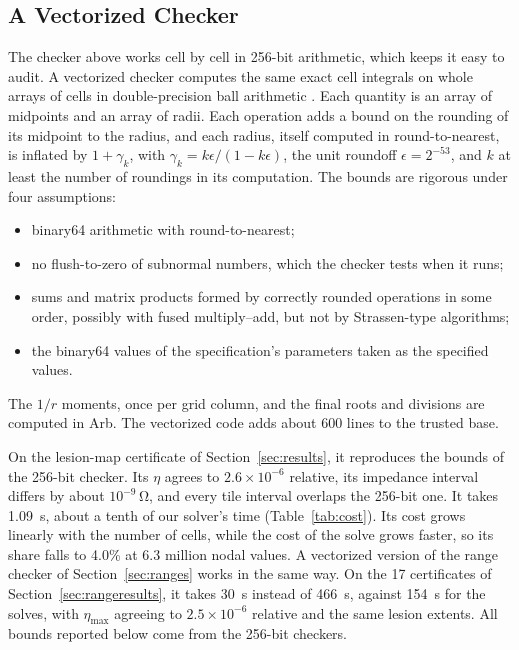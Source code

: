\documentclass[11pt]{article}
\begin{document}
\subsection{A Vectorized Checker}\label{sec:fast}
The checker above works cell by cell in 256-bit arithmetic, which keeps it easy to
audit. A vectorized checker computes the same exact cell integrals on whole arrays
of cells in double-precision ball arithmetic \cite{rump1999,rump2010}. Each
quantity is an array of midpoints and an array of radii. Each operation adds a
bound on the rounding of its midpoint to the radius, and each radius, itself
computed in round-to-nearest, is inflated by $1+\gamma_k$, with
$\gamma_k=k\epsilon/(1-k\epsilon)$, the unit roundoff $\epsilon=2^{-53}$, and $k$ at least the number of roundings in its
computation. The bounds are rigorous under four assumptions:
\begin{itemize}
\item binary64 arithmetic with round-to-nearest;
\item no flush-to-zero of subnormal numbers, which the checker tests when it runs;
\item sums and matrix products formed by correctly rounded operations in some
order, possibly with fused multiply--add, but not by Strassen-type algorithms;
\item the binary64 values of the specification's parameters taken as the specified values.
\end{itemize}
The $1/r$ moments, once per grid column, and the final roots and divisions are
computed in Arb. The vectorized code adds about 600 lines to the trusted base.

On the lesion-map certificate of Section~\ref{sec:results}, it reproduces the
bounds of the 256-bit checker. Its $\eta$ agrees to $2.6\times10^{-6}$ relative,
its impedance interval differs by about $10^{-9}$\,\si{\ohm}, and every tile
interval overlaps the 256-bit one. It takes \SI{1.09}{s}, about a tenth of
our solver's time (Table~\ref{tab:cost}). Its cost grows linearly with the number of cells,
while the cost of the solve grows faster, so its share falls to 4.0\% at 6.3
million nodal values. A vectorized version of the range checker of
Section~\ref{sec:ranges} works in the same way. On the 17 certificates of
Section~\ref{sec:rangeresults}, it takes \SI{30}{s} instead of \SI{466}{s}, against \SI{154}{s}
for the solves, with $\eta_{\max}$ agreeing to $2.5\times10^{-6}$ relative and the same
lesion extents. All bounds reported below
come from the 256-bit checkers.
\end{document}
